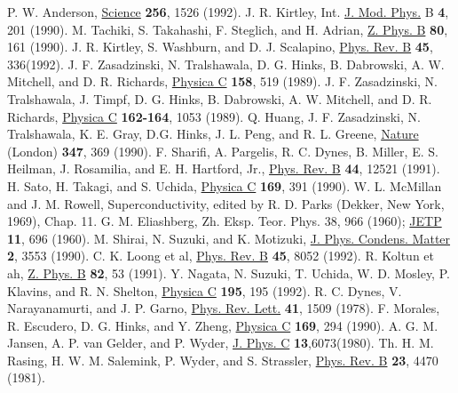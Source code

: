\documentclass[twocolumn,amsmath,floats,showpacs,nofootinbib]{revtex4}
\begin{document}
\begin{thebibliography}{}



 P. W. Anderson, \href{http://science.sciencemag.org/content/256/5063/1526/tab-pdf}{Science} \textbf{256}, 1526 (1992).
 J. R. Kirtley, Int. \href{http://dx.doi.org/10.1142/S0217979290000127}{J. Mod. Phys.} B \textbf{4}, 201 (1990).
 M. Tachiki, S. Takahashi, F. Steglich, and H. Adrian, \href{http://link.springer.com/article/10.1007/BF01357497}{Z. Phys. B} \textbf{80}, 161 (1990).
 J. R. Kirtley, S. Washburn, and D. J. Scalapino, \href{https://doi.org/10.1103/PhysRevB.45.336}{Phys. Rev. B} \textbf{45}, 336(1992).
 J. F. Zasadzinski, N. Tralshawala, D. G. Hinks, B. Dabrowski, A. W. Mitchell, and D. R. Richards, \href{https://doi.org/10.1016/0921-4534(89)90255-4
Get rights and content}{Physica C} \textbf{158}, 519 (1989).
 J. F. Zasadzinski, N. Tralshawala, J. Timpf, D. G. Hinks, B. Dabrowski, A. W. Mitchell, and D. R. Richards, \href{https://doi.org/10.1016/0921-4534(89)90589-3}{Physica C} \textbf{162-164}, 1053 (1989).
 Q. Huang, J. F. Zasadzinski, N. Tralshawala, K. E. Gray, D.G. Hinks, J. L. Peng, and R. L. Greene, \href{http://www.nature.com/nature/journal/v347/n6291/pdf/347369a0.pdf}{Nature} (London) \textbf{347}, 369 (1990).
 F. Sharifi, A. Pargelis, R. C. Dynes, B. Miller, E. S. Heilman, J. Rosamilia, and E. H. Hartford, Jr., \href{https://doi.org/10.1103/PhysRevB.44.12521}{Phys. Rev. B} \textbf{44}, 12521 (1991).
 H. Sato, H. Takagi, and S. Uchida, \href{https://doi.org/10.1016/0921-4534(90)90582-Y}{Physica C} \textbf{169}, 391 (1990).
 W. L. McMillan and J. M. Rowell, Superconductivity, edited by R. D. Parks (Dekker, New York, 1969), Chap. 11.
 G. M. Eliashberg, Zh. Eksp. Teor. Phys. 38, 966 (1960); \href{http://www.jetp.ac.ru/cgi-bin/dn/e_011_03_0696.pdf}{JETP} \textbf{11},  696 (1960).
 M. Shirai, N. Suzuki, and K. Motizuki, \href{http://iopscience.iop.org/article/10.1088/0953-8984/2/15/012/pdf}{J. Phys. Condens. Matter} \textbf{2}, 3553 (1990).
 C. K. Loong et al, \href{https://doi.org/10.1103/PhysRevB.45.8052}{Phys. Rev. B} \textbf{45}, 8052 (1992).
 R. Koltun et ah, \href{http://link.springer.com/article/10.1007/BF01313987}{Z. Phys. B} \textbf{82}, 53 (1991).
 Y. Nagata, N. Suzuki, T. Uchida, W. D. Mosley, P. Klavins, and R. N. Shelton, \href{https://doi.org/10.1016/0921-4534(92)90090-Y}{Physica C} \textbf{195}, 195 (1992).
 R. C. Dynes, V. Narayanamurti, and J. P. Garno, \href{https://doi.org/10.1103/PhysRevLett.41.1509}{Phys. Rev. Lett.} \textbf{41}, 1509 (1978).
 F. Morales, R. Escudero, D. G. Hinks, and Y. Zheng, \href{https://doi.org/10.1016/0921-4534(90)90190-P}{Physica C} \textbf{169}, 294 (1990).
 A. G. M. Jansen, A. P. van Gelder, and P. Wyder, \href{http://iopscience.iop.org/article/10.1088/0022-3719/13/33/009/pdf}{J. Phys. C} \textbf{13},6073(1980).
 Th. H. M. Rasing, H. W. M. Salemink, P. Wyder, and S. Strassler, \href{https://doi.org/10.1103/PhysRevB.23.4470}{Phys. Rev. B} \textbf{23}, 4470 (1981).

\end{thebibliography}
\end{document}
